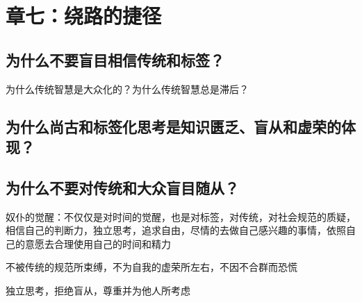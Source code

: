 \chapter{章七：绕路的捷径}

\section{为什么不要盲目相信传统和标签？}
为什么传统智慧是大众化的？为什么传统智慧总是滞后？
\section{为什么尚古和标签化思考是知识匮乏、盲从和虚荣的体现？}
\section{为什么不要对传统和大众盲目随从？}

奴仆的觉醒：不仅仅是对时间的觉醒，也是对标签，对传统，对社会规范的质疑，相信自己的判断力，独立思考，追求自由，尽情的去做自己感兴趣的事情，依照自己的意愿去合理使用自己的时间和精力

不被传统的规范所束缚，不为自我的虚荣所左右，不因不合群而恐慌

独立思考，拒绝盲从，尊重并为他人所考虑
